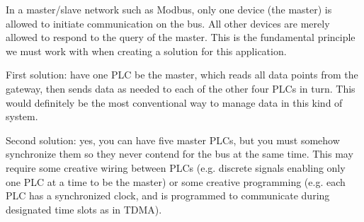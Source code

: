 In a master/slave network such as Modbus, only one device (the master) is allowed to initiate communication on the bus.  All other devices are merely allowed to respond to the query of the master.  This is the fundamental principle we must work with when creating a solution for this application.

\vskip 10pt

First solution: have one PLC be the master, which reads all data points from the gateway, then sends data as needed to each of the other four PLCs in turn.  This would definitely be the most conventional way to manage data in this kind of system.

\vskip 10pt

Second solution: yes, you can have five master PLCs, but you must somehow synchronize them so they never contend for the bus at the same time.  This may require some creative wiring between PLCs (e.g. discrete signals enabling only one PLC at a time to be the master) or some creative programming (e.g. each PLC has a synchronized clock, and is programmed to communicate during designated time slots as in TDMA).




